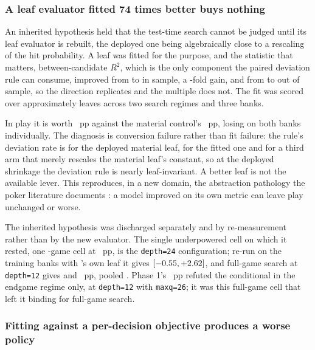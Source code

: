 \subsubsection{A leaf evaluator fitted 74 times better buys nothing}
\label{sec:development-leaf}

An inherited hypothesis held that the test-time search cannot be judged until its leaf evaluator is
rebuilt, the deployed one being algebraically close to a rescaling of the hit probability. A leaf was
fitted for the purpose, and the statistic that matters, between-candidate $R^2$, which is the only
component the paired deviation rule can consume, improved from \vsevenKoneRsqBefore{} to
\vsevenKoneRsqAfter{} in sample, a \vsevenKoneFold-fold gain, and from \vsevenKoneRsqOosBefore{} to
\vsevenKoneRsqOosAfter{} out of sample, so the direction replicates and the multiple does not. The
fit was scored over approximately \vsevenKoneLeaves{} leaves across two search regimes and three
banks.

In play it is worth \vsevenKoneInPlay{}~pp against the material control's \vsevenKoneControl{}~pp,
losing on both banks individually. The diagnosis is conversion failure rather than fit failure: the
rule's deviation rate is \vsevenKoneChangeLo{} for the deployed material leaf,
\vsevenKoneChangeMid{} for the fitted one and \vsevenKoneChangeHi{} for a third arm that merely
rescales the material leaf's constant, so at the deployed shrinkage the deviation rule is nearly
leaf-invariant. A better
leaf is not the available lever. This reproduces, in a new domain, the abstraction pathology the
poker literature documents \cite{waugh-abstraction}: a model improved on its own metric can leave
play unchanged or worse.

The inherited hypothesis was discharged separately and by re-measurement rather than by the new
evaluator. The single underpowered cell on which it rested, one \vsevenFullGameOldN{}-game cell at
\vsevenFullGameOld{}~pp, is the \texttt{depth=24} configuration; re-run on the training banks with
\vsix{}'s own leaf it gives \vsevenDepthTwentyFour{}
$[-0.55, +2.62]$, and full-game search at \texttt{depth=12}
gives \vsevenFullGameReOne{} and \vsevenFullGameReTwo{}~pp, pooled \vsevenFullGameRePooled{}.
Phase 1's \vsevenTruncatedEndgame{}~pp refuted the conditional in the endgame regime only, at
\texttt{depth=12} with \texttt{maxq=26}; it was this full-game cell that left it binding for
full-game search.

\subsubsection{Fitting against a per-decision objective produces a worse policy}
\label{sec:development-perdecision}

